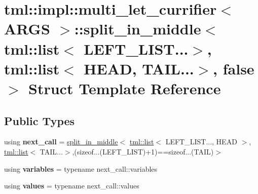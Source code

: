 \hypertarget{structtml_1_1impl_1_1multi__let__currifier_1_1split__in__middle_3_01tml_1_1list_3_01_l_e_f_t___le72d747a3c296a0f5b98662042d403db}{\section{tml\+:\+:impl\+:\+:multi\+\_\+let\+\_\+currifier$<$ A\+R\+G\+S $>$\+:\+:split\+\_\+in\+\_\+middle$<$ tml\+:\+:list$<$ L\+E\+F\+T\+\_\+\+L\+I\+S\+T...$>$, tml\+:\+:list$<$ H\+E\+A\+D, T\+A\+I\+L...$>$, false $>$ Struct Template Reference}
\label{structtml_1_1impl_1_1multi__let__currifier_1_1split__in__middle_3_01tml_1_1list_3_01_l_e_f_t___le72d747a3c296a0f5b98662042d403db}
}
\subsection*{Public Types}
\begin{DoxyCompactItemize}
\item 
\hypertarget{structtml_1_1impl_1_1multi__let__currifier_1_1split__in__middle_3_01tml_1_1list_3_01_l_e_f_t___le72d747a3c296a0f5b98662042d403db_a2d3bfa17e2d66444ad6328e24a3b2433}{using {\bfseries next\+\_\+call} = \hyperlink{structtml_1_1impl_1_1multi__let__currifier_1_1split__in__middle}{split\+\_\+in\+\_\+middle}$<$ \hyperlink{structtml_1_1list}{tml\+::list}$<$ L\+E\+F\+T\+\_\+\+L\+I\+S\+T..., H\+E\+A\+D $>$, \hyperlink{structtml_1_1list}{tml\+::list}$<$ T\+A\+I\+L...$>$,(sizeof...(L\+E\+F\+T\+\_\+\+L\+I\+S\+T)+1)==sizeof...(T\+A\+I\+L)$>$}\label{structtml_1_1impl_1_1multi__let__currifier_1_1split__in__middle_3_01tml_1_1list_3_01_l_e_f_t___le72d747a3c296a0f5b98662042d403db_a2d3bfa17e2d66444ad6328e24a3b2433}

\item 
\hypertarget{structtml_1_1impl_1_1multi__let__currifier_1_1split__in__middle_3_01tml_1_1list_3_01_l_e_f_t___le72d747a3c296a0f5b98662042d403db_af4542800cc14b351ace98018ee6a8ec3}{using {\bfseries variables} = typename next\+\_\+call\+::variables}\label{structtml_1_1impl_1_1multi__let__currifier_1_1split__in__middle_3_01tml_1_1list_3_01_l_e_f_t___le72d747a3c296a0f5b98662042d403db_af4542800cc14b351ace98018ee6a8ec3}

\item 
\hypertarget{structtml_1_1impl_1_1multi__let__currifier_1_1split__in__middle_3_01tml_1_1list_3_01_l_e_f_t___le72d747a3c296a0f5b98662042d403db_a79ad0840b1fbbfc0c5ccc51c194bbe26}{using {\bfseries values} = typename next\+\_\+call\+::values}\label{structtml_1_1impl_1_1multi__let__currifier_1_1split__in__middle_3_01tml_1_1list_3_01_l_e_f_t___le72d747a3c296a0f5b98662042d403db_a79ad0840b1fbbfc0c5ccc51c194bbe26}

\end{DoxyCompactItemize}


